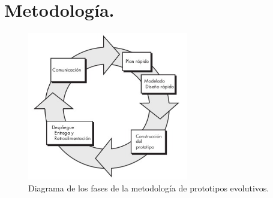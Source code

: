 \documentclass[12pt, a4paper, titlepage]{report}
\begin{document}
	    \section{Metodolog\'ia.}
    		\lipsum[5]
    		
    		 \begin{figure}[H]
    			\begin{center}	                      \includegraphics[width=7cm]{./imagenes/Introduccion/Meto_Prototipos.jpeg}
    			\caption[Fases de la metodología por prototipos]{Diagrama de los fases de la metodología de prototipos evolutivos.}
    			\label{fig:metodologia}
    			\end{center}
    		\end{figure}
    		
    		\lipsum[15]
    		
\end{document}
